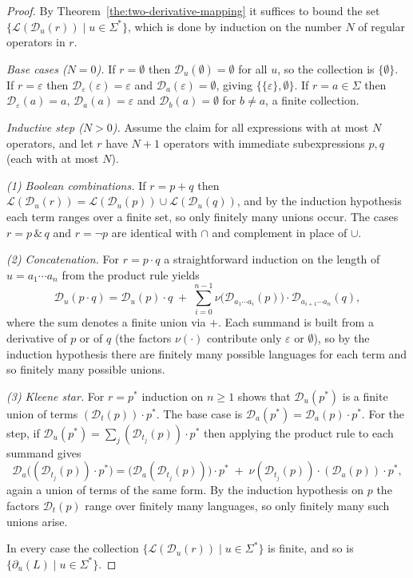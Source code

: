 \begin{proof}
By Theorem~\ref{the:two-derivative-mapping} it suffices to bound the set
$\{\mathcal{L}(\mathcal{D}_u(r))\mid u\in\Sigma^{*}\}$, which is done by induction on
the number $N$ of regular operators in $r$.

\smallskip
\noindent\emph{Base cases ($N=0$).}
If $r=\emptyset$ then $\mathcal{D}_u(\emptyset)=\emptyset$ for all $u$, so the
collection is $\{\emptyset\}$. If $r=\varepsilon$ then
$\mathcal{D}_\varepsilon(\varepsilon)=\varepsilon$ and
$\mathcal{D}_a(\varepsilon)=\emptyset$, giving $\{\{\varepsilon\},\emptyset\}$. If
$r=a\in\Sigma$ then $\mathcal{D}_\varepsilon(a)=a$, $\mathcal{D}_a(a)=\varepsilon$
and $\mathcal{D}_b(a)=\emptyset$ for $b\neq a$, a finite collection.

\smallskip
\noindent\emph{Inductive step ($N>0$).}
Assume the claim for all expressions with at most $N$ operators, and let $r$ have
$N+1$ operators with immediate subexpressions $p,q$ (each with at most $N$).

\emph{(1) Boolean combinations.} If $r=p+q$ then
$\mathcal{L}(\mathcal{D}_u(r))=\mathcal{L}(\mathcal{D}_u(p))\cup\mathcal{L}(\mathcal{D}_u(q))$,
and by the induction hypothesis each term ranges over a finite set, so only
finitely many unions occur. The cases $r=p\,\&\,q$ and $r=\neg p$ are identical
with $\cap$ and complement in place of $\cup$.

\emph{(2) Concatenation.} For $r=p\cdot q$ a straightforward induction on the
length of $u=a_1\cdots a_n$ from the product rule yields
\[
  \mathcal{D}_{u}(p\cdot q)
  = \mathcal{D}_{u}(p)\cdot q
  \;+\; \sum_{i=0}^{n-1}
        \nu\!\bigl(\mathcal{D}_{a_{1}\cdots a_{i}}(p)\bigr)\cdot
        \mathcal{D}_{a_{i+1}\cdots a_{n}}(q),
\]
where the sum denotes a finite union via $+$. Each summand is built from a
derivative of $p$ or of $q$ (the factors $\nu(\cdot)$ contribute only
$\varepsilon$ or $\emptyset$), so by the induction hypothesis there are finitely
many possible languages for each term and so finitely many possible unions.

\emph{(3) Kleene star.} For $r=p^{*}$ induction on $n\ge 1$ shows that
$\mathcal{D}_u(p^{*})$ is a finite union of terms $(\mathcal{D}_t(p))\cdot p^{*}$.
The base case is $\mathcal{D}_a(p^{*})=\mathcal{D}_a(p)\cdot p^{*}$. For the step,
if $\mathcal{D}_u(p^{*})=\sum_j (\mathcal{D}_{t_j}(p))\cdot p^{*}$ then applying the
product rule to each summand gives
\[
\mathcal{D}_a\!\bigl((\mathcal{D}_{t_j}(p))\cdot p^{*}\bigr)
= \bigl(\mathcal{D}_a(\mathcal{D}_{t_j}(p))\bigr)\cdot p^{*}
  \;+\; \nu(\mathcal{D}_{t_j}(p))\cdot(\mathcal{D}_a(p))\cdot p^{*},
\]
again a union of terms of the same form. By the induction hypothesis on $p$ the
factors $\mathcal{D}_t(p)$ range over finitely many languages, so only finitely
many such unions arise.

\smallskip
In every case the collection $\{\mathcal{L}(\mathcal{D}_u(r))\mid u\in\Sigma^{*}\}$
is finite, and so is $\{\partial_u(L)\mid u\in\Sigma^{*}\}$.
\end{proof}


